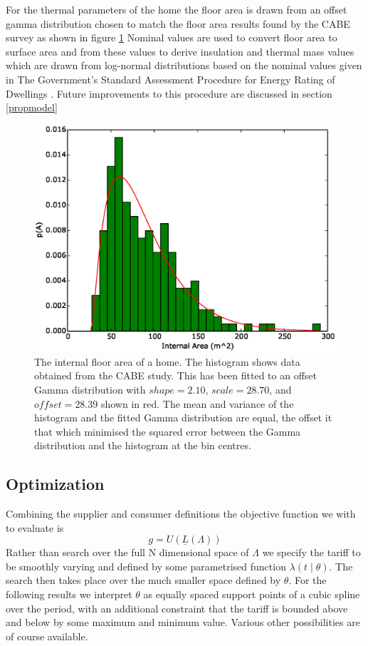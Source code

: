\documentclass[a4paper, 10 pt, conference]{ieeeconf}  %
\begin{document}
For the thermal parameters of the home the floor area is drawn from an offset gamma distribution chosen to match the floor area results found by the CABE survey as shown in figure \ref{GIA} Nominal values are used to convert floor area to surface area and from these values to derive insulation and thermal mass values which are drawn from log-normal distributions based on the nominal values given in The Government’s Standard Assessment Procedure for Energy Rating of Dwellings \cite{SAP}. Future improvements to this procedure are discussed in section \ref{propmodel}

\begin{figure}[htb]
\centering
\includegraphics[width=\columnwidth,trim =0cm 0cm 0cm 0cm,clip=True]{f3.eps}
\caption{The internal floor area of a home. The histogram shows data obtained from the CABE study. This has been fitted to an offset Gamma distribution with $shape=2.10$, $scale=28.70$, and $ offset=28.39$ shown in red. The mean and variance of the histogram and the fitted Gamma distribution are equal, the offset it that which minimised the squared error between the Gamma distribution and the histogram at the bin centres.}
\label{GIA}
\end{figure}

\subsection{Optimization}
\label{opt}
Combining the supplier and consumer definitions the objective function we with to evaluate is
\begin{equation}
g = U(\underline{L}(\Lambda))
\end{equation}
Rather than search over the full N dimensional space of $\Lambda$ we specify the tariff to be smoothly varying and defined by some parametrised function $\lambda(t \mid \theta)$. The search then takes place over the much smaller space defined by $\theta$. For the following results we interpret $\theta$ as equally spaced support points of a cubic spline over the period, with an additional constraint that the tariff is bounded above and below by some maximum and minimum value. Various other possibilities are of course available.
\end{document}
